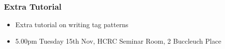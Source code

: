 \begin{frame}[fragile]
  \frametitle{Extra Tutorial}

  \begin{itemize}

  \item Extra tutorial on writing tag patterns
  \item 5.00pm Tuesday 15th Nov, HCRC Seminar Room, 2 Buccleuch Place
   
  \end{itemize}

\end{frame}




